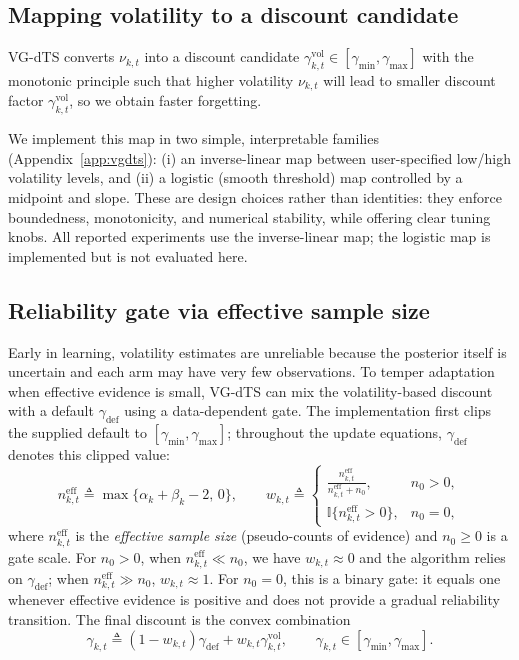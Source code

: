 \documentclass{article}
\begin{document}
\subsection{Mapping volatility to a discount candidate}
VG-dTS converts $\nu_{k,t}$ into a discount candidate $\gamma^{\mathrm{vol}}_{k,t}\in[\gamma_{\min},\gamma_{\max}]$ with the monotonic principle such that higher volatility $\nu_{k,t}$ will lead to smaller discount factor $\gamma^{\mathrm{vol}}_{k,t}$, so we obtain faster forgetting.

We implement this map in two simple, interpretable families (Appendix~\ref{app:vgdts}):
(i) an inverse-linear map between user-specified low/high volatility levels, and
(ii) a logistic (smooth threshold) map controlled by a midpoint and slope.
These are design choices rather than identities: they enforce boundedness, monotonicity, and numerical stability, while offering clear tuning knobs. All reported experiments use the inverse-linear map; the logistic map is implemented but is not evaluated here.

\subsection{Reliability gate via effective sample size}
Early in learning, volatility estimates are unreliable because the posterior itself is uncertain and each arm may have very few observations.
To temper adaptation when effective evidence is small, VG-dTS can mix the volatility-based discount with a default $\gamma_{\mathrm{def}}$ using a data-dependent gate. The implementation first clips the supplied default to $[\gamma_{\min},\gamma_{\max}]$; throughout the update equations, $\gamma_{\mathrm{def}}$ denotes this clipped value:
\begin{equation}
n^{\mathrm{eff}}_{k,t} \triangleq \max\{\alpha_k+\beta_k-2,\,0\},\qquad
w_{k,t}\triangleq
\begin{cases}
\frac{n^{\mathrm{eff}}_{k,t}}{n^{\mathrm{eff}}_{k,t}+n_0}, & n_0>0,\\
\mathbb{I}\{n^{\mathrm{eff}}_{k,t}>0\}, & n_0=0,
\end{cases}
\label{eq:gate_main}
\end{equation}
where $n^{\mathrm{eff}}_{k,t}$ is the \emph{effective sample size} (pseudo-counts of evidence) and $n_0\ge 0$ is a gate scale.
For $n_0>0$, when $n^{\mathrm{eff}}_{k,t}\ll n_0$, we have $w_{k,t}\approx 0$ and the algorithm relies on $\gamma_{\mathrm{def}}$; when $n^{\mathrm{eff}}_{k,t}\gg n_0$, $w_{k,t}\approx 1$. For $n_0=0$, this is a binary gate: it equals one whenever effective evidence is positive and does not provide a gradual reliability transition.
The final discount is the convex combination
\begin{equation}
\gamma_{k,t} \triangleq (1-w_{k,t})\gamma_{\mathrm{def}} + w_{k,t}\gamma^{\mathrm{vol}}_{k,t},
\qquad
\gamma_{k,t}\in[\gamma_{\min},\gamma_{\max}].
\label{eq:gamma_mix_main}
\end{equation}
\end{document}
